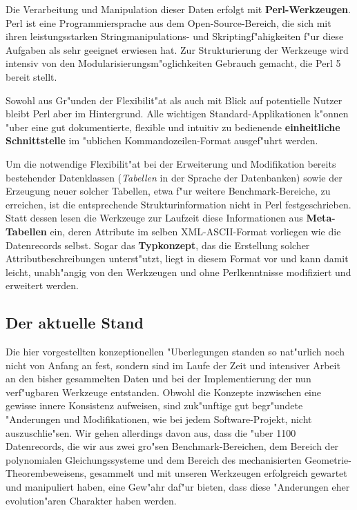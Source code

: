 \documentclass{article}
\begin{document}
Die Verarbeitung und Manipulation dieser Daten erfolgt mit {\bf
Perl-Werkzeugen}. Perl ist eine Programmiersprache aus dem
Open-Source-Bereich, die sich mit ihren leistungsstarken
String\-manipulations- und Skriptingf"ahigkeiten f"ur diese Aufgaben
als sehr geeignet erwiesen hat. Zur Strukturierung der Werkzeuge wird
intensiv von den Modularisierungsm"oglichkeiten Gebrauch gemacht, die
Perl 5 bereit stellt.

Sowohl aus Gr"unden der Flexibilit"at als auch mit Blick auf
potentielle Nutzer bleibt Perl aber im Hintergrund. Alle wichtigen
Standard-Applikationen k"onnen "uber eine gut dokumentierte, flexible
und intuitiv zu bedienende {\bf einheitliche Schnittstelle} im
"ublichen Kommandozeilen-Format ausgef"uhrt werden. 

Um die notwendige Flexibilit"at bei der Erweiterung und Modifikation
bereits bestehender Datenklassen ({\em Tabellen} in der Sprache der
Datenbanken) sowie der Erzeugung neuer solcher Tabellen, etwa f"ur
weitere Benchmark-Bereiche, zu erreichen, ist die entsprechende
Strukturinformation nicht in Perl festgeschrieben. Statt dessen lesen
die Werkzeuge zur Laufzeit diese Informationen aus {\bf Meta-Tabellen}
ein, deren Attribute im selben XML-ASCII-Format vorliegen wie die
Datenrecords selbst.  Sogar das {\bf Typkonzept}, das die Erstellung
solcher Attributbeschreibungen unterst"utzt, liegt in diesem Format
vor und kann damit leicht, unabh"angig von den Werkzeugen und ohne
Perlkenntnisse modifiziert und erweitert werden.

\subsection*{Der aktuelle Stand}

Die hier vorgestellten konzeptionellen "Uberlegungen standen so
nat"urlich noch nicht von Anfang an fest, sondern sind im Laufe der
Zeit und intensiver Arbeit an den bisher gesammelten Daten und bei der
Implementierung der nun verf"ugbaren Werkzeuge entstanden.  Obwohl die
Konzepte inzwischen eine gewisse innere Konsistenz aufweisen, sind
zuk"unftige gut begr"undete "Anderungen und Modifikationen, wie bei
jedem Software-Projekt, nicht auszuschlie"sen.  Wir gehen allerdings
davon aus, dass die "uber 1100 Datenrecords, die wir aus zwei gro"sen
Benchmark-Bereichen, dem Bereich der polynomialen Gleichungssysteme
und dem Bereich des mechanisierten Geometrie-Theorembeweisens,
gesammelt und mit unseren Werkzeugen erfolgreich gewartet und
manipuliert haben, eine Gew"ahr daf"ur bieten, dass diese "Anderungen
eher evolution"aren Charakter haben werden. 
\end{document}
